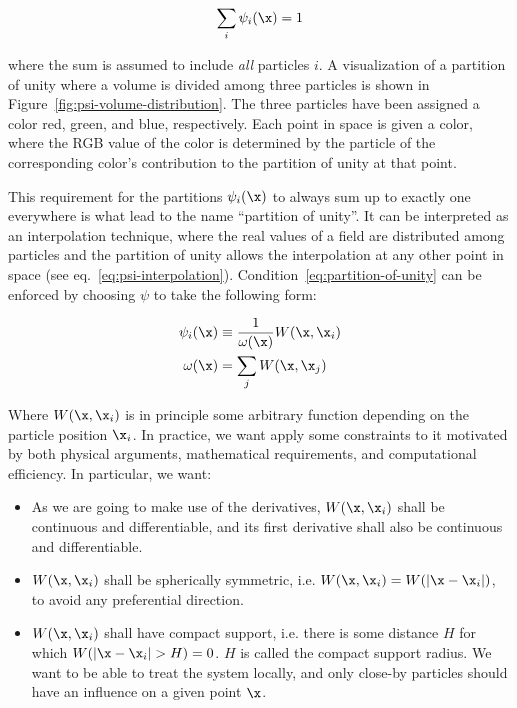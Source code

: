 \begin{equation}
    \sum_i \psi_i(\x) = 1 \label{eq:partition-of-unity}
\end{equation}

where the sum is assumed to include \emph{all} particles $i$. A visualization of a partition of
unity where a volume is divided among three particles is shown in
Figure~\ref{fig:psi-volume-distribution}. The three particles have been assigned a color red, green,
and blue, respectively. Each point in space is given a color, where the RGB value of the color is
determined by the particle of the corresponding color's contribution to the partition of unity at
that point.

This requirement for the partitions $\psi_i(\x)$ to always sum up to exactly one everywhere is what
lead to the name ``partition of unity''. It can be interpreted as an interpolation technique, where
the real values of a field are distributed among particles and the partition of unity allows the
interpolation at any other point in space (see eq.~\ref{eq:psi-interpolation}).
Condition~\ref{eq:partition-of-unity} can be enforced by choosing $\psi$ to take the following form:

\begin{align}
    \psi_i(\x) &\equiv \frac{1}{\omega(\x)} W(\x, \x_i) \label{eq:psi}\\
    \omega(\x) &= \sum_j W(\x, \x_j) \label{eq:omega}
\end{align}


Where $W(\x, \x_i)$ is in principle some arbitrary function depending on the particle position
$\x_i$. In practice, we want apply some constraints to it motivated by both physical arguments,
mathematical requirements, and computational efficiency. In particular, we want:

\begin{itemize}
 \item As we are going to make use of the derivatives, $W(\x, \x_i)$ shall be continuous and
differentiable, and its first derivative shall also be continuous and differentiable.
 \item $W(\x, \x_i)$ shall be spherically symmetric, i.e. $W(\x, \x_i) = W(|\x - \x_i|)$, to avoid
any preferential direction.
 \item $W(\x, \x_i)$ shall have compact support, i.e. there is some distance $H$ for which
$W(|\x - \x_i| > H) = 0$. $H$ is called the compact support radius. We want to be able to treat the
system locally, and only close-by particles should have an influence on a given point $\x$.
\end{itemize}


